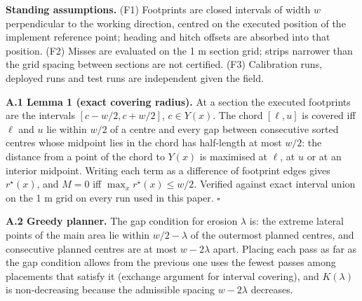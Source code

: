 \documentclass[preprint,12pt,authoryear]{elsarticle}
\begin{document}
\textbf{Standing assumptions.} (F1) Footprints are closed intervals of width \(w\) perpendicular to the working direction, centred on the executed position of the implement reference point; heading and hitch offsets are absorbed into that position. (F2) Misses are evaluated on the 1 m section grid; strips narrower than the grid spacing between sections are not certified. (F3) Calibration runs, deployed runs and test runs are independent given the field.

\textbf{A.1 Lemma 1 (exact covering radius).} At a section the executed footprints are the intervals \([c-w/2,c+w/2]\), \(c\in Y(x)\). The chord \([\ell,u]\) is covered iff \(\ell\) and \(u\) lie within \(w/2\) of a centre and every gap between consecutive sorted centres whose midpoint lies in the chord has half-length at most \(w/2\): the distance from a point of the chord to \(Y(x)\) is maximised at \(\ell\), at \(u\) or at an interior midpoint. Writing each term as a difference of footprint edges gives \(r^\star(x)\), and \(M=0\) iff \(\max_x r^\star(x)\le w/2\). Verified against exact interval union on the 1 m grid on every run used in this paper. \(\square\)

\textbf{A.2 Greedy planner.} The gap condition for erosion \(\lambda\) is: the extreme lateral points of the main area lie within \(w/2-\lambda\) of the outermost planned centres, and consecutive planned centres are at most \(w-2\lambda\) apart. Placing each pass as far as the gap condition allows from the previous one uses the fewest passes among placements that satisfy it (exchange argument for interval covering), and \(K(\lambda)\) is non-decreasing because the admissible spacing \(w-2\lambda\) decreases.
\end{document}
